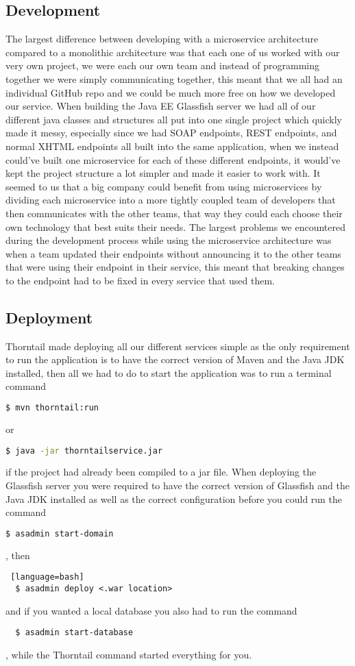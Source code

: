 \subsection{Development}
The largest difference between developing with a microservice architecture compared to a monolithic architecture was that each one of us worked with our very own project, we were each our own team and instead of programming together we were simply communicating together, this meant that we all had an individual GitHub repo and we could be much more free on how we developed our service. When building the Java EE Glassfish server we had all of our different java classes and structures all put into one single project which quickly made it messy, especially since we had SOAP endpoints, REST endpoints, and normal XHTML endpoints all built into the same application, when we instead could’ve built one microservice for each of these different endpoints, it would’ve kept the project structure a lot simpler and made it easier to work with. It seemed to us that a big company could benefit from using microservices by dividing each microservice into a more tightly coupled team of developers that then communicates with the other teams, that way they could each choose their own technology that best suits their needs. The largest problems we encountered during the development process while using the microservice architecture was when a team updated their endpoints without announcing it to the other teams that were using their endpoint in their service, this meant that breaking changes to the endpoint had to be fixed in every service that used them.

\subsection{Deployment}
Thorntail made deploying all our different services simple as the only requirement to run the application is to have the correct version of Maven and the Java JDK installed, then all we had to do to start the application was to run a terminal command
\begin{lstlisting}[language=bash]
  $ mvn thorntail:run
\end{lstlisting} or
\begin{lstlisting}[language=bash]
  $ java -jar thorntailservice.jar
\end{lstlisting} if the project had already been compiled to a jar file. When deploying the Glassfish server you were required to have the correct version of Glassfish and the Java JDK installed as well as the correct configuration before you could run the command 
\begin{lstlisting}[language=bash]
  $ asadmin start-domain
\end{lstlisting}, then 
\begin{lstlisting} [language=bash]
  $ asadmin deploy <.war location>
\end{lstlisting}
and if you wanted a local database you also had to run the command 
\begin{lstlisting}
  $ asadmin start-database
\end{lstlisting}
, while the Thorntail command started everything for you.

